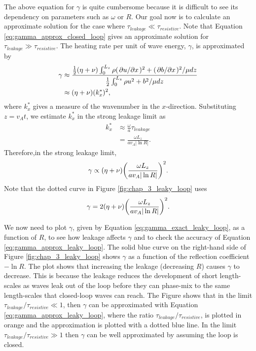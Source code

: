 The above equation for $\gamma$ is quite cumbersome because it is difficult to see its dependency on parameters such as $\omega$ or $R$. Our goal now is to calculate an approximate solution for the case where $\tau_{leakage}\ll \tau_{resistive}$. Note that Equation \eqref{eq:gamma_approx_closed_loop} gives an approximate solution for $\tau_{leakage}\gg \tau_{resistive}$. The heating rate per unit of wave energy, $\gamma$, is approximated by
\begin{equation}
    \begin{aligned}
    \gamma &\approx \frac{\frac{1}{2}(\eta+\nu)\int_0^{L_z}\rho (\pdv*{u}{x})^2 + (\pdv*{b}{x})^2/\mu dz}{\frac{1}{2}\int_0^{L_z}\rho u^2 + b^2/\mu dz} \\
    &\approx (\eta+\nu)(k_x^*)^2,
    \end{aligned}
\end{equation}
where $k_x^*$ gives a measure of the wavenumber in the $x$-direction. Substituting $z=v_A t$, we estimate $k_x^*$ in the strong leakage limit as
\begin{equation}
\begin{aligned}
    k_x^* &\approx \frac{\omega}{a}\tau_{leakage} \\
    &=\frac{\omega L_z}{a v_A |\ln R|}.
\end{aligned}
\end{equation}
Therefore,in the strong leakage limit,
\[
    \gamma \propto (\eta + \nu)\qty(\frac{\omega L_z}{a v_A |\ln R|})^2.
\]
Note that the dotted curve in Figure \ref{fig:chap_3_leaky_loop} uses
\begin{equation}
    \label{eq:gamma_approx_leaky_loop}
    \gamma = 2(\eta + \nu)\qty(\frac{\omega L_z}{a v_A |\ln R|})^2.
\end{equation}

We now need to plot $\gamma$, given by Equation \eqref{eq:gamma_exact_leaky_loop}, as a function of $R$, to see how leakage affects $\gamma$ and to check the accuracy of Equation \eqref{eq:gamma_approx_leaky_loop}. The solid blue curve on the right-hand side of Figure \ref{fig:chap_3_leaky_loop} shows $\gamma$ as a function of the reflection coefficient $-\ln R$. The plot shows that increasing the leakage (decreasing $R$) causes $\gamma$ to decrease. This is because the leakage reduces the development of short length-scales as waves leak out of the loop before they can phase-mix to the same length-scales that closed-loop waves can reach. The Figure shows that in the limit $\tau_{leakage} / \tau_{resistive} \ll 1$, then $\gamma$ can be approximated with Equation \eqref{eq:gamma_approx_leaky_loop}, where the ratio $\tau_{leakage} / \tau_{resistive}$, is plotted in orange and the approximation is plotted with a dotted blue line. In the limit $\tau_{leakage} / \tau_{resistive} \gg 1$ then $\gamma$ can be well approximated by assuming the loop is closed.

